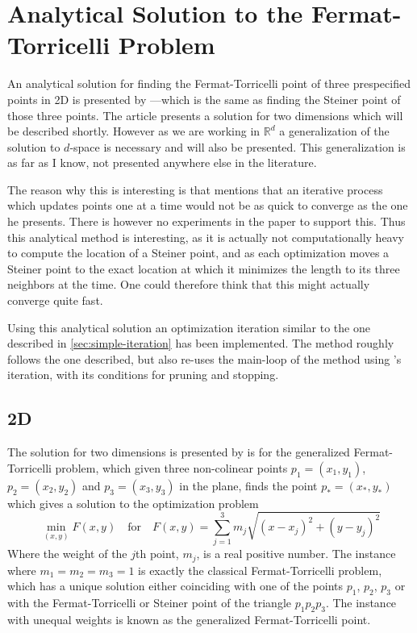 \section{Analytical Solution to the Fermat-Torricelli Problem}
\label{sec:analyt-solut-ferm}

An analytical solution for finding the Fermat-Torricelli point of three
prespecified points in 2D is presented by \textcite{uteshev2014}---which is the same as
finding the Steiner point of those three points. The article presents a
solution for two dimensions which will be described shortly. However as we are working
in $\mathbb{R}^d$ a generalization of the solution to $d$-space is necessary and
will also be presented. This generalization is as far as I know, not presented
anywhere else in the literature.

The reason why this is interesting is that \textcite{smith1992} mentions that an
iterative process which updates points one at a time would not be as quick to
converge as the one he presents. There is however no experiments in the paper to
support this. Thus this analytical method is interesting, as it is actually not
computationally heavy to compute the location of a Steiner point, and as each
optimization moves a Steiner point to the exact location at which it minimizes
the length to its three neighbors at the time. One could therefore think that this might
actually converge quite fast.

Using this analytical solution an optimization iteration similar to the one
described in \cref{sec:simple-iteration} has been implemented. The method
roughly follows the one described, but also re-uses the main-loop of the method
using \citeauthor{smith1992}'s iteration, with its conditions for pruning and
stopping.

\subsection{2D}
\label{sec:2d}

The solution for two dimensions is presented by \textcite{uteshev2014} is for
the generalized Fermat-Torricelli problem, which given three non-colinear points
$p_1 = (x_1, y_1)$, $p_2 = (x_2, y_2)$ and $p_3 = (x_3, y_3)$ in the plane,
finds the point $p_\ast = (x_\ast, y_\ast)$ which gives a solution to the
optimization problem
%
\begin{equation}
  \min_{(x,y)} F(x,y) \quad \text{for} \quad F(x,y) = \sum_{j=1}^3 m_j
  \sqrt{{(x-x_j)}^2 + {(y-y_j)}^2}
\end{equation}
%
Where the weight of the $j$th point, $m_j$, is a real positive number. The
instance where $m_1 = m_2 = m_3 = 1$ is exactly the classical Fermat-Torricelli
problem, which has a unique solution either coinciding with one of the points
$p_1$, $p_2$, $p_3$ or with the Fermat-Torricelli or Steiner point of the
triangle $p_1 p_2 p_3$. The instance with unequal weights is known as the
generalized Fermat-Torricelli point.

